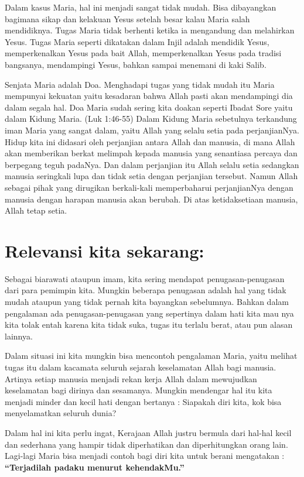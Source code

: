 Dalam kasus Maria, hal ini menjadi sangat tidak mudah. Bisa dibayangkan bagimana sikap dan kelakuan Yesus setelah besar kalau Maria salah mendidiknya. Tugas Maria tidak berhenti ketika ia mengandung dan melahirkan Yesus. Tugas Maria seperti dikatakan dalam Injil adalah mendidik Yesus, memperkenalkan Yesus pada bait Allah, memperkenalkan Yesus pada tradisi bangsanya, mendampingi Yesus, bahkan sampai menemani di kaki Salib.

Senjata Maria adalah Doa. Menghadapi tugas yang tidak mudah itu Maria mempunyai kekuatan yaitu kesadaran bahwa Allah pasti akan mendampingi dia dalam segala hal. Doa Maria sudah sering kita doakan seperti Ibadat Sore yaitu dalam Kidung Maria.
(Luk 1:46-55) Dalam Kidung Maria sebetulnya terkandung iman Maria yang sangat dalam, yaitu Allah yang selalu setia pada perjanjianNya. Hidup kita ini didasari oleh perjanjian antara Allah dan manusia, di mana Allah akan memberikan berkat melimpah kepada manusia yang senantiasa percaya dan berpegang teguh padaNya. Dan dalam perjanjian itu Allah selalu setia sedangkan manusia seringkali lupa dan tidak setia dengan perjanjian tersebut. Namun Allah sebagai pihak yang dirugikan berkali-kali memperbaharui perjanjianNya dengan manusia dengan harapan manusia akan berubah. Di atas ketidaksetiaan manusia, Allah tetap setia.

\section*{Relevansi kita sekarang:}

Sebagai biarawati ataupun imam, kita sering mendapat penugasan-penugasan dari para pemimpin kita. Mungkin beberapa penugasan adalah hal yang tidak mudah ataupun yang tidak pernah kita bayangkan sebelumnya. Bahkan dalam pengalaman ada penugasan-penugasan yang sepertinya dalam hati kita mau nya kita tolak entah karena kita tidak suka, tugas itu terlalu berat, atau pun alasan lainnya.

Dalam situasi ini kita mungkin bisa mencontoh pengalaman Maria, yaitu melihat tugas itu dalam kacamata seluruh sejarah keselamatan Allah bagi manusia. Artinya setiap manusia menjadi rekan kerja Allah dalam mewujudkan keselamatan bagi dirinya dan sesamanya. Mungkin mendengar hal itu kita menjadi minder dan kecil hati dengan bertanya : Siapakah diri kita, kok bisa menyelamatkan seluruh dunia?

Dalam hal ini kita perlu ingat, Kerajaan Allah justru bermula dari hal-hal kecil dan sederhana yang hampir tidak diperhatikan dan diperhitungkan orang lain. Lagi-lagi Maria bisa menjadi contoh bagi diri kita untuk berani mengatakan :  \textbf{“Terjadilah padaku menurut kehendakMu.”}

